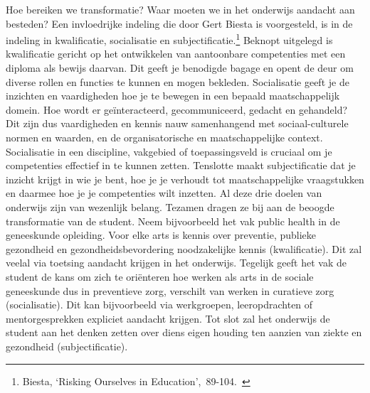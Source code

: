 \documentclass[smallauthor, chapterhaspagenum, nochapterinheader, pagenuminheader,  bigchapnum,medium2, tocpages, garamond, titleinheader]{jote-book}
\begin{document}
	Hoe bereiken we transformatie? Waar moeten we in het onderwijs aandacht aan besteden? Een invloedrijke indeling die door Gert Biesta is voorgesteld, is in de indeling in kwalificatie, socialisatie en subjectificatie.\footnote{Biesta, ‘Risking Ourselves in Education', 89-104. } Beknopt uitgelegd is kwalificatie gericht op het ontwikkelen van aantoonbare competenties met een diploma als bewijs daarvan. Dit geeft je benodigde bagage en opent de deur om diverse rollen en functies te kunnen en mogen bekleden. Socialisatie geeft je de inzichten en vaardigheden hoe je te bewegen in een bepaald maatschappelijk domein. Hoe wordt er geïnteracteerd, gecommuniceerd, gedacht en gehandeld? Dit zijn dus vaardigheden en kennis nauw samenhangend met sociaal-culturele normen en waarden, en de organisatorische en maatschappelijke context. Socialisatie in een discipline, vakgebied of toepassingsveld is cruciaal om je competenties effectief in te kunnen zetten. Tenslotte maakt subjectificatie dat je inzicht krijgt in wie je bent, hoe je je verhoudt tot maatschappelijke vraagstukken en daarmee hoe je je competenties wilt inzetten. Al deze drie doelen van onderwijs zijn van wezenlijk belang. Tezamen dragen ze bij aan de beoogde transformatie van de student. Neem bijvoorbeeld het vak public health in de geneeskunde opleiding. Voor elke arts is kennis over preventie, publieke gezondheid en gezondheidsbevordering noodzakelijke kennis (kwalificatie). Dit zal veelal via toetsing aandacht krijgen in het onderwijs. Tegelijk geeft het vak de student de kans om zich te oriënteren hoe werken als arts in de sociale geneeskunde dus in preventieve zorg, verschilt van werken in curatieve zorg (socialisatie). Dit kan bijvoorbeeld via werkgroepen, leeropdrachten of mentorgesprekken expliciet aandacht krijgen. Tot slot zal het onderwijs de student aan het denken zetten over diens eigen houding ten aanzien van ziekte en gezondheid (subjectificatie).
\end{document}
